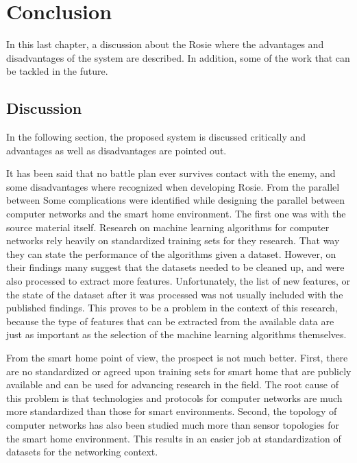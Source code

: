 \chapter{Conclusion}
In this last chapter, a discussion about the Rosie where the advantages and disadvantages of the system are described. In addition, some of the work that can be tackled in the future.




\section{Discussion}

In the following section, the proposed system is discussed critically and advantages as well as disadvantages are pointed out. 

It has been said that no battle plan ever survives contact with the enemy, and some disadvantages where recognized when developing Rosie. From the parallel between Some complications were identified while designing the parallel between computer networks and the smart home environment. The first one was with the source material itself. Research on machine learning algorithms for computer networks rely heavily on standardized training sets for they research. That way they can state the performance of the algorithms given a dataset. However, on their findings many suggest that the datasets needed to be cleaned up, and were also processed to extract more features. Unfortunately, the list of new features, or the state of the dataset after it was processed was not usually included with the published findings. This proves to be a problem in the context of this research, because the type of features that can be extracted from the available data are just as important as the selection of the machine learning algorithms themselves.

From the smart home point of view, the prospect is not much better. First, there are no standardized or agreed upon training sets for smart home that are publicly available and can be used for advancing research in the field. The root cause of this problem is that technologies and protocols for computer networks are much more standardized than those for smart environments. Second, the topology of computer networks has also been studied much more than sensor topologies for the smart home environment. This results in an easier job at standardization of datasets for the networking context.

